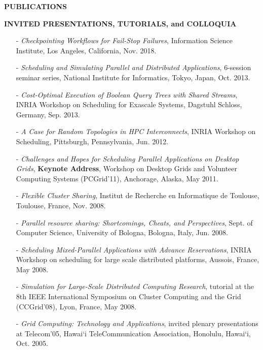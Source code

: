 \documentclass[times,11pt]{letter}
\begin{document}
\noindent
{\large{\bf PUBLICATIONS}}



\noindent
{\large{\bf INVITED PRESENTATIONS, TUTORIALS, and COLLOQUIA}}

\begin{itemize}

    \item [-] {\it Checkpointing Workflows for Fail-Stop Failures}, 
Information Science Institute, Los Angeles, California, Nov. 2018.

\item [-] {\it Scheduling and Simulating Parallel and Distributed
Applications}, 6-session seminar series, National Institute for
Informatics, Tokyo, Japan, Oct. 2013.

\item [-] {\it Cost-Optimal Execution of Boolean Query Trees with Shared
Streams}, INRIA Workshop on Scheduling for Exascale Systems, Dagstuhl
Schloss, Germany, Sep. 2013.

\item [-] {\it A Case for Random Topologies in HPC Interconnects},
INRIA Workshop on Scheduling, Pittsburgh, Pennsylvania, 
Jun. 2012.

\item [-] {\it Challenges and Hopes for Scheduling Parallel Applications on Desktop Grids}, {\bf Keynote Address}, Workshop on Desktop Grids and Volunteer Computing Systems (PCGrid'11), Anchorage, Alaska, May 2011. 

\item [-] {\it Flexible Cluster Sharing}, Institut de Recherche
en Informatique de Toulouse, Toulouse, France, Nov. 2008. 

\item [-] {\it Parallel resource sharing: Shortcomings, Cheats, and
Perspectives}, Sept. of Computer Science, University of Bologna, Bologna,
Italy, Jun. 2008.


\item [-] {\it Scheduling Mixed-Parallel Applications with Advance
Reservations}, INRIA Workshop on scheduling for large scale distributed
platforms, Aussois, France, May 2008.

\item [-] {\it Simulation for Large-Scale Distributed Computing Research},
tutorial at the 8th IEEE International Symposium on Cluster Computing and the Grid (CCGrid'08), Lyon, France, May 2008.

\item [-] {\it Grid Computing: Technology and Applications}, invited
plenary presentations at Telecom'05, Hawai`i TeleCommunication Association,
Honolulu, Hawai`i, Oct. 2005.


\end{itemize}
\end{document}
